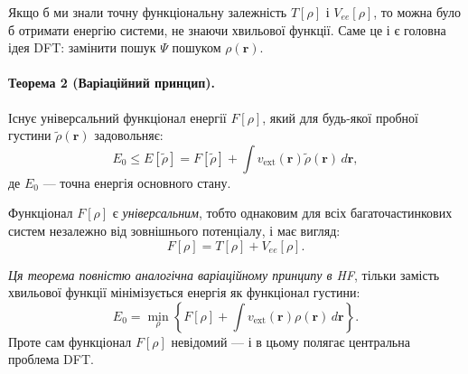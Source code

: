 Якщо б ми знали точну функціональну залежність $T[\rho]$ і $V_{ee}[\rho]$, то можна було б отримати енергію системи, не знаючи хвильової функції. Саме це і є головна ідея DFT: замінити пошук $\Psi$ пошуком $\rho(\mathbf{r})$.

\medskip
\paragraph{Теорема 2 (Варіаційний принцип).}
Існує універсальний функціонал енергії $F[\rho]$, який для будь-якої пробної густини $\tilde{\rho}(\mathbf{r})$ задовольняє:
\begin{equation}
	E_0 \leq E[\tilde{\rho}] = F[\tilde{\rho}] + \int v_{\text{ext}}(\mathbf{r}) \tilde{\rho}(\mathbf{r})\, d\mathbf{r},
\end{equation}
де $E_0$ --- точна енергія основного стану.

\noindent
Функціонал $F[\rho]$ є \emph{універсальним}, тобто однаковим для всіх багаточастинкових систем незалежно від зовнішнього потенціалу, і має вигляд:
\begin{equation*}
	F[\rho] = T[\rho] + V_{ee}[\rho].
\end{equation*}

\textit{Ця теорема повністю аналогічна варіаційному принципу в HF}, тільки замість хвильової функції мінімізується енергія як функціонал густини:
\begin{equation*}
	E_0 = \min_\rho \left\{ F[\rho] + \int v_{\text{ext}}(\mathbf{r}) \rho(\mathbf{r})\, d\mathbf{r} \right\}.
\end{equation*}
Проте сам функціонал $F[\rho]$ невідомий --- і в цьому полягає центральна проблема DFT.

